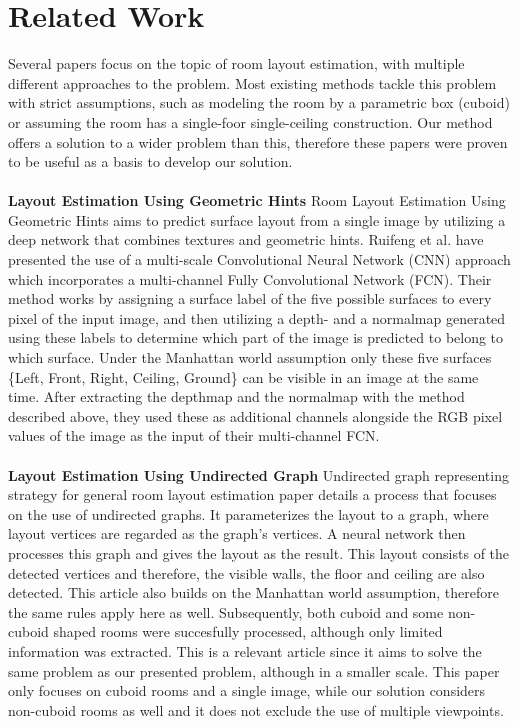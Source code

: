 \section{Related Work}
\label{sec:relatedwork}

Several papers focus on the topic of room layout estimation, with multiple
different approaches to the problem. Most existing methods tackle this problem
with strict assumptions, such as modeling the room by a parametric box (cuboid)
or assuming the room has a single-foor single-ceiling construction. Our method offers a solution to a wider problem than this, therefore these papers were proven to be useful as a basis to develop our solution.

\paragraph{}

\textbf{Layout Estimation Using Geometric Hints} Room Layout Estimation Using
Geometric Hints\cite{8451365} aims to predict surface layout from a single image
by utilizing a deep network that combines textures and geometric hints. 
Ruifeng et al. \cite{8451365} have presented the use of a multi-scale 
Convolutional Neural Network (CNN) approach which incorporates a multi-channel
Fully Convolutional Network (FCN).
Their method works by assigning a surface label of the five possible surfaces to
every pixel of the input image, and then utilizing a depth- and a normalmap
generated using these labels to determine which part of the image is predicted to
belong to which surface. Under the Manhattan world assumption\cite{790349} only
these five surfaces \{Left, Front, Right, Ceiling, Ground\} can be visible in an
image at the same time. After extracting the depthmap and the normalmap with the
method described above, they used these as additional channels alongside the RGB
pixel values of the image as the input of their multi-channel FCN.

\paragraph{}

\textbf{Layout Estimation Using Undirected Graph}
Undirected graph representing strategy for general room layout estimation\cite{YAO2023103963}
paper details a process that focuses on the use of undirected graphs. It parameterizes the layout to a graph, where layout vertices are regarded as the graph's vertices. A neural network then processes this graph and gives the layout as the result. This layout consists of the detected vertices and therefore, the visible walls, the floor and ceiling are also detected. This article also builds on the Manhattan world assumption\cite{790349}, therefore the same rules apply here as well. Subsequently, both cuboid and some non-cuboid shaped rooms were succesfully processed, although only limited information was extracted. This is a relevant article since it aims to solve the same problem as our presented problem, although in a smaller scale. This paper only focuses on cuboid rooms and a single image, while our solution considers non-cuboid rooms as well and it does not exclude the use of multiple viewpoints. 

